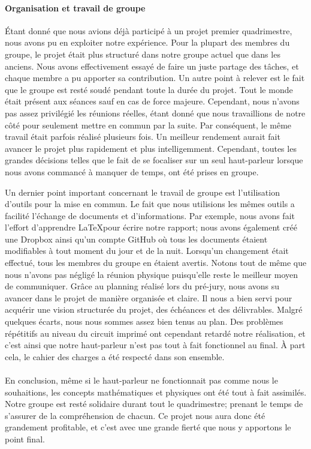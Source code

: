 \paragraph {Organisation et travail de groupe}
Étant donné que nous avions déjà participé à un projet premier quadrimestre, nous avons pu en exploiter 
notre expérience.  Pour la plupart des membres du groupe, le projet était plus structuré dans notre groupe
actuel que dans les anciens. Nous avons effectivement essayé de faire un juste partage des tâches, et chaque
membre a pu apporter sa contribution. Un autre point à relever est le fait que le groupe est resté soudé 
pendant toute la durée du projet. Tout le monde était présent aux séances sauf en cas de force majeure. 
Cependant, nous n'avons pas assez privilégié les réunions réelles, étant donné que nous travaillions de notre
côté pour seulement mettre en commun par la suite. Par conséquent, le même travail était parfois réalisé
plusieurs fois. Un meilleur rendement aurait fait avancer le projet plus rapidement et plus intelligemment.
Cependant, toutes les grandes décisions telles que le fait de se focaliser sur un seul haut-parleur lorsque 
nous avons commancé à manquer de temps, ont été prises en groupe.


Un dernier point important concernant le travail de groupe est l'utilisation d'outils pour la mise en commun.
Le fait que nous utilisions les mêmes outils a facilité l’échange de documents et d’informations. 
Par exemple, nous avons fait l’effort d’apprendre \LaTeX pour écrire notre rapport; nous avons également créé
une Dropbox ainsi qu’un compte GitHub où tous les documents étaient modifiables à tout moment du jour et de 
la nuit. Lorsqu'un changement était effectué, tous les membres du groupe en étaient avertis. 
Notons tout de même que nous n'avons pas négligé la réunion physique puisqu'elle reste 
le meilleur moyen de communiquer. 
Grâce au planning réalisé lors du pré-jury, nous avons su avancer dans le projet de manière organisée et 
claire. Il nous a bien servi pour acquérir une vision structurée du projet, des échéances
et des délivrables. Malgré quelques écarts, nous nous sommes assez bien tenus au plan. Des problèmes répétitifs 
au niveau du circuit imprimé ont cependant retardé notre réalisation, et c'est ainsi que notre haut-parleur 
n'est pas tout à fait fonctionnel au final. À part cela, le cahier des charges a été respecté dans son ensemble.


\paragraph{} 
En conclusion, même si le haut-parleur ne fonctionnait pas comme nous le souhaitions, les concepts 
mathématiques et physiques ont été tout à fait assimilés. Notre groupe est resté solidaire durant tout 
le quadrimestre; prenant le temps de s'assurer de la compréhension de chacun. Ce projet nous aura donc été
grandement profitable, et c'est avec une grande fierté que nous y apportons le point final.






